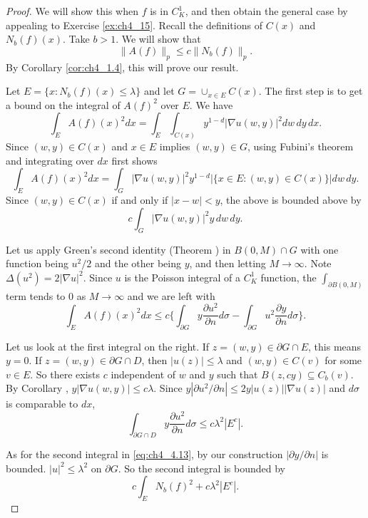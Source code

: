 \begin{proof}
We will show this when $f$ is in $C_K^1$, and then obtain the general case by appealing to Exercise \ref{ex:ch4_15}. Recall the definitions of $C(x)$ and $N_b(f)(x)$. Take $b > 1$. We will show that
\begin{equation}\label{eq:ch4_4.12}
    \|A(f)\|_p \leq c\|N_b(f)\|_p.
\end{equation}
By Corollary \ref{cor:ch4_1.4}, this will prove our result.

Let $E = \{x : N_b(f)(x) \leq \lambda\}$ and let $G = \cup_{x\in E}C(x)$. The first step is to get a bound on the integral of $A(f)^2$ over $E$. We have
\[
    \int_E A(f)(x)^2dx = \int_E \int_{C(x)} y^{1-d}|\nabla u(w,y)|^2 dw\,dy\,dx.
\]
Since $(w,y) \in C(x)$ and $x \in E$ implies $(w,y) \in G$, using Fubini's theorem and integrating over $dx$ first shows
\[
    \int_E A(f)(x)^2dx = \int_G |\nabla u(w,y)|^2y^{1-d}|\{x \in E : (w,y) \in C(x)\}|dw\,dy.
\]
Since $(w,y) \in C(x)$ if and only if $|x-w| < y$, the above is bounded above by
\[
    c \int_G |\nabla u(w,y)|^2y\,dw\,dy.
\]

Let us apply Green's second identity (Theorem ) in $B(0,M)\cap G$ with one function being $u^2/2$ and the other being $y$, and then letting $M \to \infty$. Note $\Delta(u^2) = 2|\nabla u|^2$. Since $u$ is the Poisson integral of a $C_K^1$ function, the $\int_{\partial B(0,M)}$ term tends to $0$ as $M \to \infty$ and we are left with
\begin{equation}\label{eq:ch4_4.13}
    \int_E A(f)(x)^2dx \leq c\Big\{\int_{\partial G} y\frac{\partial u^2}{\partial n}d\sigma - \int_{\partial G} u^2\frac{\partial y}{\partial n}d\sigma\Big\}.
\end{equation}

Let us look at the first integral on the right. If $z = (w,y) \in \partial G \cap E$, this means $y = 0$. If $z = (w,y) \in \partial G \cap D$, then $|u(z)| \leq \lambda$ and $(w,y) \in C(v)$ for some $v \in E$. So there exists $c$ independent of $w$ and $y$ such that $B(z,cy) \subseteq C_b(v)$. By Corollary , $y|\nabla u(w,y)| \leq c\lambda$. Since $y|\partial u^2/\partial n| \leq 2y|u(z)||\nabla u(z)|$ and $d\sigma$ is comparable to $dx$,
\mpagebreak
\[
    \int_{\partial G\cap D} y\frac{\partial u^2}{\partial n}d\sigma \leq c\lambda^2|E^c|.
\]

As for the second integral in \eqref{eq:ch4_4.13}, by our construction $|\partial y/\partial n|$ is bounded. $|u|^2 \leq \lambda^2$ on $\partial G$. So the second integral is bounded by
\[
    c \int_E N_b(f)^2 + c\lambda^2|E^c|.
\]


\end{proof}
